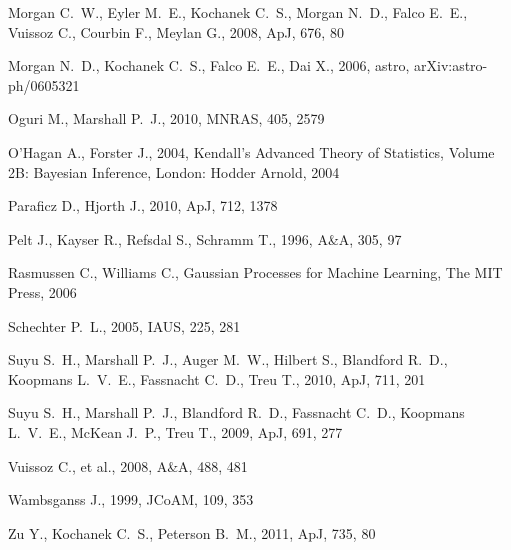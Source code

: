\documentclass[useAMS,usenatbib, a4paper]{mn2e} \usepackage{natbib}
\begin{document}
\begin{thebibliography}{99}
Morgan C.~W., Eyler M.~E., Kochanek C.~S., Morgan N.~D., Falco E.~E., 
Vuissoz C., Courbin F., Meylan G., 2008, ApJ, 676, 80 

Morgan N.~D., Kochanek C.~S., Falco E.~E., Dai X., 2006, astro, 
arXiv:astro-ph/0605321 

 Oguri M., Marshall P.~J., 2010, MNRAS, 405, 2579 

 O'Hagan A., Forster J., 2004, Kendall's Advanced Theory of Statistics, Volume 2B: Bayesian Inference, London: Hodder Arnold, 2004

 Paraficz D., Hjorth J., 2010, ApJ, 712, 1378 

 Pelt J., Kayser R., Refsdal S., Schramm T., 1996, A\&A, 305, 97 

 Rasmussen C., Williams C., Gaussian Processes for Machine Learning, The MIT Press, 2006

Schechter P.~L., 2005, IAUS, 225, 281 

Suyu S.~H., Marshall P.~J., Auger M.~W., Hilbert S., Blandford R.~D., 
Koopmans L.~V.~E., Fassnacht C.~D., Treu T., 2010, ApJ, 711, 201 

Suyu S.~H., Marshall P.~J., Blandford R.~D., Fassnacht C.~D., Koopmans 
L.~V.~E., McKean J.~P., Treu T., 2009, ApJ, 691, 277 

 Vuissoz C., et al., 2008, A\&A, 488, 481 

Wambsganss J., 1999, JCoAM, 109, 353 

 Zu Y., Kochanek C.~S., Peterson B.~M., 2011, ApJ, 735, 80 
\end{thebibliography}
\end{document}
